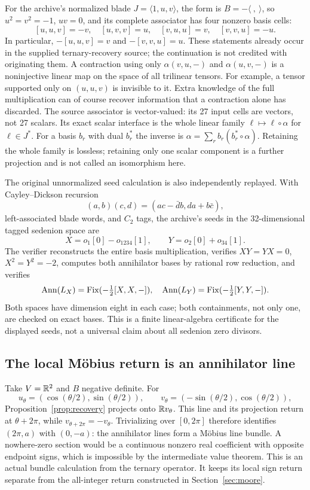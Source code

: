 \documentclass[11pt,reqno]{amsart}
\theoremstyle{definition}\newtheorem{definition}[theorem]{Definition}
\theoremstyle{remark}\newtheorem{remark}[theorem]{Remark}
\begin{document}
For the archive's normalized blade $J=\langle1,u,v\rangle$, the form is
$B=-\langle\ ,\ \rangle$, so $u^2=v^2=-1$, $uv=0$, and its complete associator
has four nonzero basis cells:
\[
 [u,u,v]=-v,\quad [u,v,v]=u,\quad [v,u,u]=v,\quad [v,v,u]=-u.
\]
In particular, $-[u,u,v]=v$ and $-[v,v,u]=u$. These statements already occur in
the supplied ternary-recovery source; the continuation is not credited with
originating them. A contraction using only $\alpha(v,u,-)$ and $\alpha(u,v,-)$
is a noninjective linear map on the space of all trilinear tensors. For example,
a tensor supported only on $(u,u,v)$ is invisible to it. Extra knowledge of the
full multiplication can of course recover information that a contraction alone
has discarded.
The source associator is vector-valued: its 27 input cells are vectors, not
27 scalars. Its exact scalar interface is the whole linear family
$\ell\mapsto\ell\circ\alpha$ for $\ell\in J^*$. For a basis $b_r$ with dual
$b_r^*$ the inverse is $\alpha=\sum_r b_r(b_r^*\circ\alpha)$. Retaining the
whole family is lossless; retaining only one scalar component is a further
projection and is not called an isomorphism here.

The original unnormalized seed calculation is also independently replayed. With
Cayley--Dickson recursion
\[
 (a,b)(c,d)=(ac-\bar d b,da+b\bar c),
\]
left-associated blade words, and $C_2$ tags, the archive's seeds in the
32-dimensional tagged sedenion space are
\[
 X=o_1[0]-o_{1234}[1],\qquad Y=o_2[0]+o_{34}[1].
\]
The verifier reconstructs the entire basis multiplication, verifies
$XY=YX=0$, $X^2=Y^2=-2$, computes both annihilator bases by rational row
reduction, and verifies
\[
 \operatorname{Ann}(L_X)=\operatorname{Fix}(-\tfrac12[X,X,-]),\quad
 \operatorname{Ann}(L_Y)=\operatorname{Fix}(-\tfrac12[Y,Y,-]).
\]
Both spaces have dimension eight in each case; both containments, not only one,
are checked on exact bases. This is a finite linear-algebra certificate for the
displayed seeds, not a universal claim about all sedenion zero divisors.

\subsection{The local M\"obius return is an annihilator line}
Take $V=\mathbb R^2$ and $B$ negative definite. For
\[
 u_\theta=(\cos(\theta/2),\sin(\theta/2)),\qquad
 v_\theta=(-\sin(\theta/2),\cos(\theta/2)),
\]
Proposition~\ref{prop:recovery} projects onto $\mathbb R v_\theta$. This line and its
projection return at $\theta+2\pi$, while $v_{\theta+2\pi}=-v_\theta$.
Trivializing over $[0,2\pi]$ therefore identifies $(2\pi,a)$ with $(0,-a)$:
the annihilator lines form a M\"obius line bundle. A nowhere-zero section would
be a continuous nonzero real coefficient with opposite endpoint signs, which
is impossible by the intermediate value theorem. This is an actual bundle
calculation from the ternary operator. It keeps its local sign return separate
from the all-integer return constructed in Section~\ref{sec:moore}.
\end{document}
